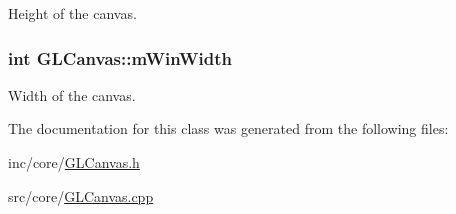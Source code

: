 Height of the canvas. 

\hypertarget{class_g_l_canvas_aece06a3918baceaa5a7c8468f2fda76b}{
\subsubsection[{m\+Win\+Width}]{\setlength{\rightskip}{0pt plus 5cm}int G\+L\+Canvas\+::m\+Win\+Width\hspace{0.3cm}{\ttfamily [private]}}}\label{class_g_l_canvas_aece06a3918baceaa5a7c8468f2fda76b}


Width of the canvas. 



The documentation for this class was generated from the following files\+:\begin{DoxyCompactItemize}
\item 
inc/core/\hyperlink{_g_l_canvas_8h}{G\+L\+Canvas.\+h}\item 
src/core/\hyperlink{_g_l_canvas_8cpp}{G\+L\+Canvas.\+cpp}\end{DoxyCompactItemize}
